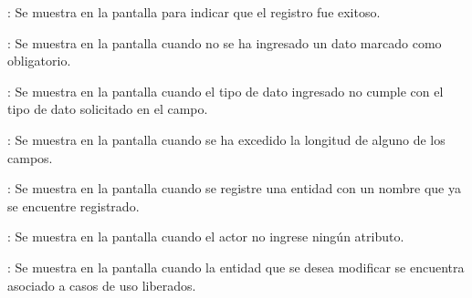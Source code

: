 \begin{Citemize}
	\item {}: Se muestra en la pantalla  para indicar que el registro fue exitoso.
	\item {}: Se muestra en la pantalla  cuando no se ha ingresado un dato marcado como obligatorio.
	\item {}: Se muestra en la pantalla  cuando el tipo de dato ingresado no cumple con el tipo de dato solicitado en el campo.
	\item {}: Se muestra en la pantalla  cuando se ha excedido la longitud de alguno de los campos.
	\item {}: Se muestra en la pantalla  cuando se registre una entidad con un nombre que ya se encuentre registrado.
	\item {}: Se muestra en la pantalla  cuando el actor no ingrese ningún atributo.
	\item {}: Se muestra en la pantalla  cuando la entidad que se desea modificar se encuentra asociado a casos de uso liberados.
\end{Citemize}
